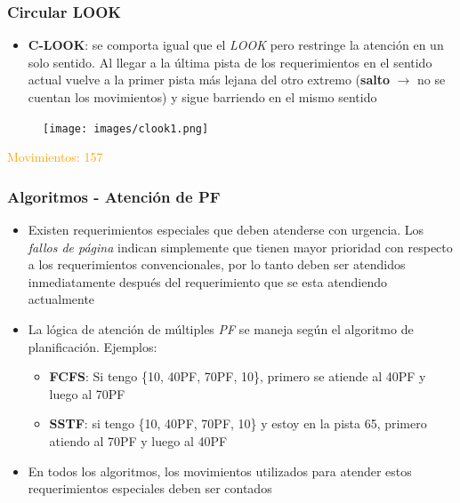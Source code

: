 \begin{frame}
  \frametitle{\textbf{Circular LOOK}}
  \begin{itemize}
    \item \textbf{C-LOOK}: se comporta igual que el \textit{LOOK} pero restringe la atención en un solo sentido. Al llegar a la  última pista de los requerimientos en el sentido actual vuelve a la primer pista más lejana del otro extremo (\textbf{salto} $\rightarrow$ no se cuentan los movimientos) y sigue barriendo en el mismo sentido
  \end{itemize}
  \begin{figure}
    \texttt{[image: images/clook1.png]}
  \end{figure}
  \hspace{35pt} \textcolor{orange}{Movimientos: 157}
\end{frame}

\begin{frame}
  \frametitle{Algoritmos - Atención de \textbf{PF}}
  \begin{itemize}
    \item Existen requerimientos especiales que deben atenderse con urgencia. Los \textit{fallos de página} indican simplemente que tienen mayor prioridad con respecto a los requerimientos convencionales, por lo tanto deben ser atendidos inmediatamente después del requerimiento que se esta atendiendo actualmente    
    \item La lógica de atención de múltiples \textit{PF} se maneja según el algoritmo de planificación. Ejemplos:
    \begin{itemize}
      \item \textbf{FCFS}: Si tengo \{10, 40PF, 70PF, 10\}, primero se atiende al 40PF y luego al 70PF
      \item \textbf{SSTF}: si tengo \{10, 40PF, 70PF, 10\} y estoy en la pista 65, primero atiendo al 70PF y luego al 40PF
    \end{itemize}
    \item En todos los algoritmos, los movimientos utilizados para atender estos requerimientos especiales deben ser contados
  \end{itemize}
\end{frame}

